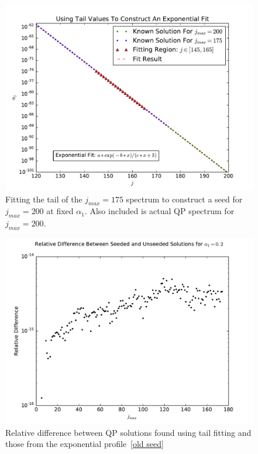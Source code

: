 \documentclass[letterpaper,11pt]{article}
\begin{document}
\begin{figure}[h]
\centering
  	\includegraphics[scale=0.5]{TailFitPlot}
  	\caption{Fitting the tail of the $j_{max} = 175$ spectrum to construct a seed for $j_{max} = 200$ at fixed $\alpha_1$. Also included is actual QP spectrum for $j_{max} = 200$.}
  	\label{fig: tail fitting}
\end{figure}
\begin{figure}[h]
  	\centering
	\includegraphics[scale=0.5]{SeedvsUnseed}
	\caption{Relative difference between QP solutions found using tail fitting and those from the exponential profile~\eqref{old seed}}
	\label{fig: seedvsunseed}
\end{figure}





\end{document}
